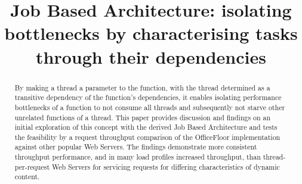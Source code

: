 \documentclass[conference]{ieee/IEEEtran}
\begin{document}
\title{Job Based Architecture: isolating bottlenecks by characterising tasks
through their dependencies}


\author{
}


% 








\maketitle


\begin{abstract}
By making a thread a parameter to the function, with the thread determined as a
transitive dependency of the function's dependencies, it enables isolating
performance bottlenecks of a function to not consume all threads and
subsequently not starve other unrelated functions of a thread.  This paper
provides discussion and findings on an initial exploration of this concept with the
derived Job Based Architecture and tests the feasibility by a request throughput
comparison of the OfficeFloor implementation against other popular Web Servers.
The findings demonstrate more consistent throughput performance, and in many
load profiles increased throughput, than thread-per-request Web Servers for
servicing requests for differing characteristics of dynamic content.
\end{abstract}
\end{document}
